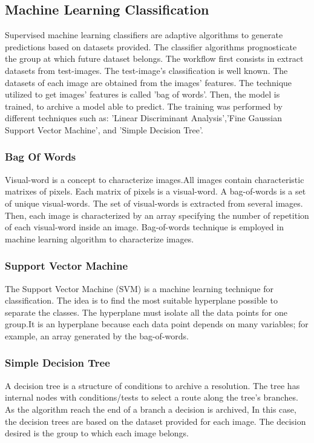 \documentclass[12pt,a4paper]{article}
\begin{document}
\subsection{Machine Learning Classification}
Supervised machine learning classifiers are adaptive algorithms to generate predictions based on datasets provided. The classifier algorithms prognosticate the group at which future dataset belongs.  The workflow first consists in extract datasets from test-images. The test-image's classification is well known. The datasets of each image are obtained from the images' features. The technique utilized to get images' features is called 'bag of words'. Then, the model is trained, to archive a model able to predict. The training was performed by different techniques such as: 'Linear Discriminant Analysis','Fine Gaussian Support Vector Machine', and 'Simple Decision Tree'. 

\subsubsection{Bag Of Words}
Visual-word is a concept to characterize images.All images contain characteristic matrixes of pixels. Each matrix of pixels is a visual-word. A bag-of-words is a set of unique visual-words. The set of visual-words is extracted from several images. Then, each image is characterized by an array specifying the number of repetition of each visual-word inside an image. Bag-of-words technique is employed in machine learning algorithm to characterize images. 

\subsubsection{Support Vector Machine}

The Support Vector Machine (SVM) is a machine learning technique for classification. The idea is to find the most suitable hyperplane possible to separate the classes. The hyperplane must isolate all the data points for one group.It is an hyperplane because each data point depends on many variables; for example, an array generated by the bag-of-words.

\subsubsection{Simple Decision Tree}
A decision tree is a structure of conditions to archive a resolution. The tree has internal nodes with conditions/tests to select a route along the tree's branches.  As the algorithm reach the end of a branch a decision is archived, In this case, the decision trees are based on the dataset provided for each image. The decision desired is the group to which each image belongs.  
\end{document}
